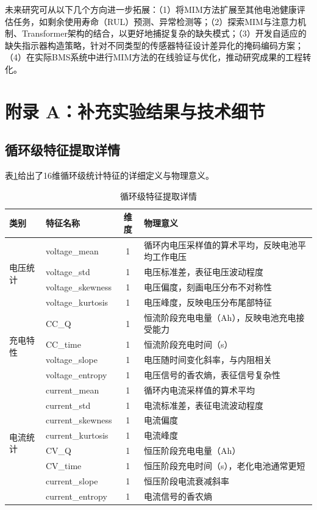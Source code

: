 \documentclass[10pt,a4paper]{ctexart}
\begin{document}
未来研究可从以下几个方向进一步拓展：（1）将MIM方法扩展至其他电池健康评估任务，如剩余使用寿命（RUL）预测、异常检测等；（2）探索MIM与注意力机制、Transformer架构的结合，以更好地捕捉复杂的缺失模式；（3）开发自适应的缺失指示器构造策略，针对不同类型的传感器特征设计差异化的掩码编码方案；（4）在实际BMS系统中进行MIM方法的在线验证与优化，推动研究成果的工程转化。




\appendix
\section{附录 A：补充实验结果与技术细节}

\subsection{循环级特征提取详情}

表\ref{tab:features}给出了16维循环级统计特征的详细定义与物理意义。

\begin{table}[H]
\centering
\caption{循环级特征提取详情}
\label{tab:features}
\begin{tabular}{@{}llcp{6cm}@{}}
\toprule
\textbf{类别} & \textbf{特征名称} & \textbf{维度} & \textbf{物理意义} \\
\midrule
\multirow{4}{*}{电压统计} 
& voltage\_mean & 1 & 循环内电压采样值的算术平均，反映电池平均工作电压 \\
& voltage\_std & 1 & 电压标准差，表征电压波动程度 \\
& voltage\_skewness & 1 & 电压偏度，刻画电压分布不对称性 \\
& voltage\_kurtosis & 1 & 电压峰度，反映电压分布尾部特征 \\
\midrule
\multirow{4}{*}{充电特性} 
& CC\_Q & 1 & 恒流阶段充电电量（Ah），反映电池充电接受能力 \\
& CC\_time & 1 & 恒流阶段充电时间（s） \\
& voltage\_slope & 1 & 电压随时间变化斜率，与内阻相关 \\
& voltage\_entropy & 1 & 电压信号的香农熵，表征信号复杂性 \\
\midrule
\multirow{8}{*}{电流统计} 
& current\_mean & 1 & 循环内电流采样值的算术平均 \\
& current\_std & 1 & 电流标准差，表征电流波动程度 \\
& current\_skewness & 1 & 电流偏度 \\
& current\_kurtosis & 1 & 电流峰度 \\
& CV\_Q & 1 & 恒压阶段充电电量（Ah） \\
& CV\_time & 1 & 恒压阶段充电时间（s），老化电池通常更短 \\
& current\_slope & 1 & 恒压阶段电流衰减斜率 \\
& current\_entropy & 1 & 电流信号的香农熵 \\
\bottomrule
\end{tabular}
\end{table}
\end{document}

